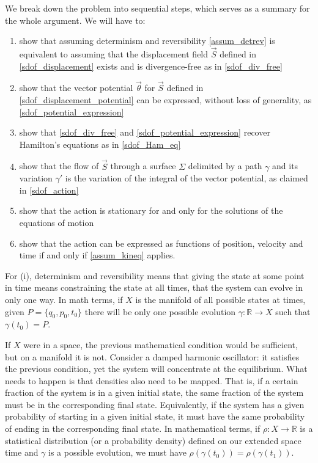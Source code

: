 \documentclass[10pt,twocolumn, nofootinbib]{revtex4-2}
\begin{document}
We break down the problem into sequential steps, which serves as a summary for the whole argument. We will have to:
\begin{enumerate}[label=(\roman*)]
	\item show that assuming determinism and reversibility \ref{assum_detrev} is equivalent to assuming that the displacement field $\vec{S}$ defined in \ref{sdof_displacement} exists and is divergence-free as in \ref{sdof_div_free}
	\item show that the vector potential $\vec{\theta}$ for $\vec{S}$ defined in \ref{sdof_displacement_potential} can be expressed, without loss of generality, as \ref{sdof_potential_expression}
	\item show that \ref{sdof_div_free} and \ref{sdof_potential_expression} recover Hamilton's equations as in \ref{sdof_Ham_eq}
	\item show that the flow of $\vec{S}$ through a surface $\Sigma$ delimited by a path $\gamma$ and its variation $\gamma'$ is the variation of the integral of the vector potential, as claimed in \ref{sdof_action}
	\item show that the action is stationary for and only for the solutions of the equations of motion
	\item show that the action can be expressed as functions of position, velocity and time if and only if \ref{assum_kineq} applies.
\end{enumerate}

For (i), determinism and reversibility means that giving the state at some point in time means constraining the state at all times, that the system can evolve in only one way. In math terms, if $X$ is the manifold of all possible states at times, given $P = \{q_0, p_0, t_0\}$ there will be only one possible evolution $\gamma : \mathbb{R} \to X$ such that $\gamma(t_0) = P$.

If $X$ were in a space, the previous mathematical condition would be sufficient, but on a manifold it is not. Consider a damped harmonic oscillator: it satisfies the previous condition, yet the system will concentrate at the equilibrium. What needs to happen is that densities also need to be mapped. That is, if a certain fraction of the system is in a given initial state, the same fraction of the system must be in the corresponding final state. Equivalently, if the system has a given probability of starting in a given initial state, it must have the same probability of ending in the corresponding final state. In mathematical terms, if $\rho : X \to \mathbb{R}$ is a statistical distribution (or a probability density) defined on our extended space time and $\gamma$ is a possible evolution, we must have $\rho(\gamma(t_0)) = \rho(\gamma(t_1))$.
\end{document}
